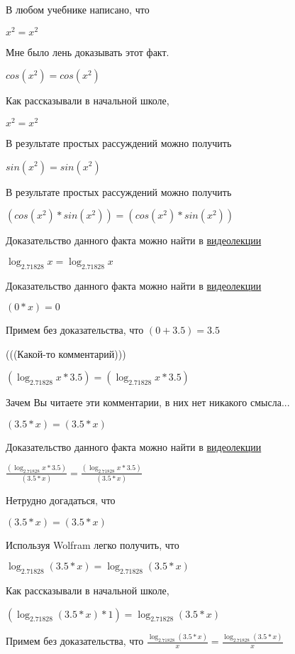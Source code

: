 \documentclass[12pt,a4paper,fleqn]{article}
\theoremstyle{definition}
\begin{document}
В любом учебнике написано, что

${ x }^{ 2 } = { x }^{ 2 }$

Мне было лень доказывать этот факт.

$cos({ x }^{ 2 }) = cos({ x }^{ 2 })$

Как рассказывали в начальной школе,

${ x }^{ 2 } = { x }^{ 2 }$

В результате простых рассуждений можно получить

$sin({ x }^{ 2 }) = sin({ x }^{ 2 })$

В результате простых рассуждений можно получить

$(cos({ x }^{ 2 }) * sin({ x }^{ 2 })) = (cos({ x }^{ 2 }) * sin({ x }^{ 2 }))$

Доказательство данного факта можно найти в \href{https://www.youtube.com/watch?v=dQw4w9WgXcQ}{видеолекции}

$\log_{ 2.71828 }{ x } = \log_{ 2.71828 }{ x }$

Доказательство данного факта можно найти в \href{https://www.youtube.com/watch?v=dQw4w9WgXcQ}{видеолекции}

$( 0  *  x ) =  0 $

Примем без доказательства, что
$( 0  +  3.5 ) =  3.5 $

(((Какой-то комментарий)))

$(\log_{ 2.71828 }{ x } *  3.5 ) = (\log_{ 2.71828 }{ x } *  3.5 )$

Зачем Вы читаете эти комментарии, в них нет никакого смысла...

$( 3.5  *  x ) = ( 3.5  *  x )$

Доказательство данного факта можно найти в \href{https://www.youtube.com/watch?v=dQw4w9WgXcQ}{видеолекции}

$\frac{(\log_{ 2.71828 }{ x } *  3.5 )}{( 3.5  *  x )}
 = \frac{(\log_{ 2.71828 }{ x } *  3.5 )}{( 3.5  *  x )}
$

Нетрудно догадаться, что

$( 3.5  *  x ) = ( 3.5  *  x )$

Используя Wolfram легко получить, что

$\log_{ 2.71828 }{( 3.5  *  x )} = \log_{ 2.71828 }{( 3.5  *  x )}$

Как рассказывали в начальной школе,

$(\log_{ 2.71828 }{( 3.5  *  x )} *  1 ) = \log_{ 2.71828 }{( 3.5  *  x )}$

Примем без доказательства, что
$\frac{\log_{ 2.71828 }{( 3.5  *  x )}}{ x }
 = \frac{\log_{ 2.71828 }{( 3.5  *  x )}}{ x }
$
\end{document}
